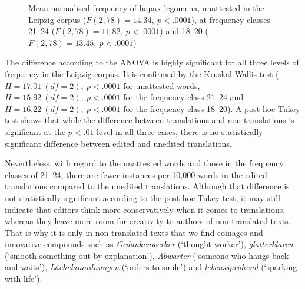\documentclass[output=paper]{LSP/langsci}
\begin{document}
\begin{figure}
  \caption{Mean normalised frequency of hapax legomena, unattested in the Leipzig corpus ($F(2,78)=14.34,~p<.0001$), at frequency classes 21--24 ($F(2,78)=11.82,~p<.0001$) and 18--20 ($F(2,78)=13.45,~p<.0001$)}\label{bisiada:fig:lexic}
\end{figure}

\newpage
The difference according to the ANOVA is highly significant for all three levels of frequency in the Leipzig corpus. It is confirmed by the Kruskal-Wallis test ($H=17.01~(df=2),~p<.0001$ for unattested words, $H=15.92~(df=2),~p<.0001$ for the frequency class 21--24 and $H=16.22~(df=2),~p<.0001$ for the frequency class 18--20). A post-hoc Tukey test shows that while the difference between translations and non-translations is significant at the $p<.01$ level in all three cases, there is no statistically significant difference between edited and unedited translations.

Nevertheless, with regard to the unattested words and those in the frequency classes of 21--24, there are fewer instances per 10,000 words in the edited translations compared to the unedited translations. Although that difference is not statistically significant according to the post-hoc Tukey test, it may still indicate that editors think more conservatively when it comes to  translations, whereas they leave more room for creativity to authors of non-translated texts. That is why it is only in non-translated texts that we find coinages and innovative compounds such as \emph{Gedankenwerker} (`thought worker'), \emph{glatterklären} (`smooth something out by explanation'), \emph{Abwarter} (`someone who hangs back and waits'), \emph{Lächelanordnungen} (`orders to smile') and \emph{lebenssprühend} (`sparking with life').
\end{document}
